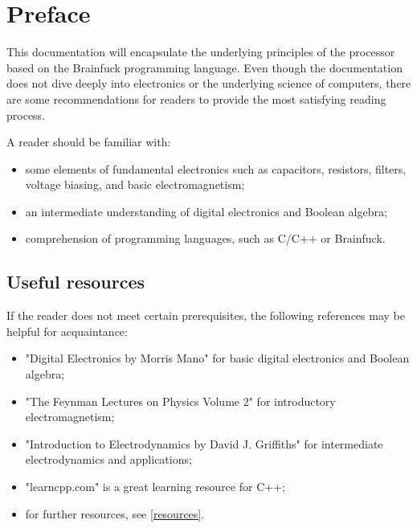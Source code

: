 \section{Preface} \label{sec:preface}
This documentation will encapsulate the underlying principles of the processor based on the Brainfuck programming language. Even though the documentation does not dive deeply into electronics or the underlying science of computers, there are some recommendations for readers to provide the most satisfying reading process.

A reader should be familiar with:
\begin{itemize}
	\item some elements of fundamental electronics such as capacitors, resistors, filters, voltage biasing, and basic electromagnetism;
	\item an intermediate understanding of digital electronics and Boolean algebra;
	\item comprehension of programming languages, such as C/C++ or Brainfuck.
\end{itemize}

\subsection{Useful resources}
If the reader does not meet certain prerequisites, the following references may be helpful for acquaintance:
\begin{itemize}
	\item "Digital Electronics by Morris Mano" for basic digital electronics and Boolean algebra;
	\item "The Feynman Lectures on Physics Volume 2" for introductory electromagnetism;
	\item "Introduction to Electrodynamics by David J. Griffiths" for intermediate electrodynamics and applications;
	\item "learncpp.com" is a great learning resource for C++;
	\item for further resources, see \ref{resources}.
\end{itemize}
